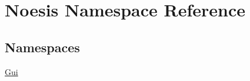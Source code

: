 \hypertarget{namespace_noesis}{\section{Noesis Namespace Reference}
\label{namespace_noesis}
}
\subsection*{Namespaces}
\begin{DoxyCompactItemize}
\item 
\hyperlink{namespace_noesis_1_1_gui}{Gui}
\end{DoxyCompactItemize}
